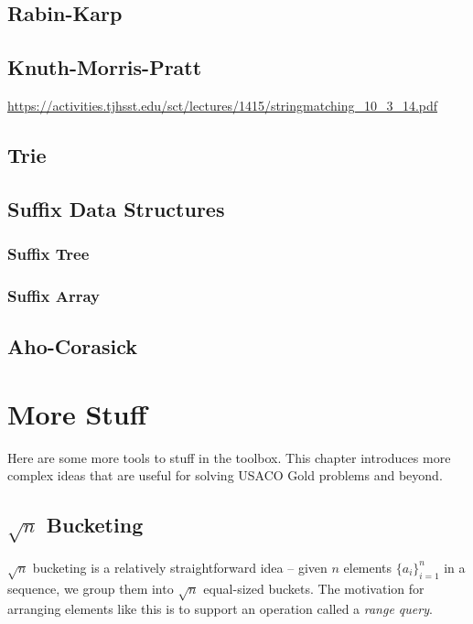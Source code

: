 \documentclass[11pt]{book}
\begin{document}
\section{Rabin-Karp}

\section{Knuth-Morris-Pratt}

\url{https://activities.tjhsst.edu/sct/lectures/1415/stringmatching_10_3_14.pdf}

\section{Trie}

\section{Suffix Data Structures}

\subsection{Suffix Tree}

\subsection{Suffix Array}

\section{Aho-Corasick}

\chapter{More Stuff}

Here are some more tools to stuff in the toolbox. This chapter introduces more complex ideas that are useful for solving USACO Gold problems and beyond.

\section{$\sqrt{n}$ Bucketing}

$\sqrt{n}$ bucketing is a relatively straightforward idea -- given $n$ elements $\{a_i\}_{i=1}^n$ in a sequence, we group them into $\sqrt{n}$ equal-sized buckets. The motivation for arranging elements like this is to support an operation called a \textit{range query}.
\end{document}
